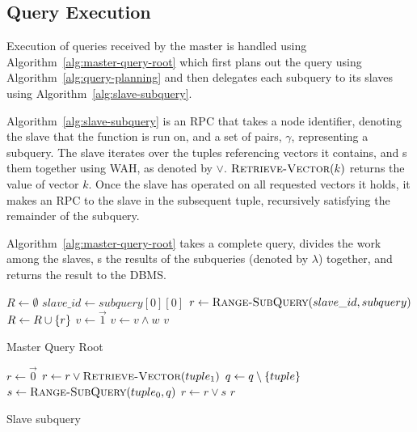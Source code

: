 \subsection{Query Execution}
Execution of queries received by the master is handled using
Algorithm~\ref{alg:master-query-root} which first plans out the query using
Algorithm~\ref{alg:query-planning} and then delegates each subquery to its
slaves using Algorithm~\ref{alg:slave-subquery}.
\par
Algorithm~\ref{alg:slave-subquery} is an RPC that takes a node identifier,
denoting the slave that the function is run on, and a set of pairs, \(\gamma\),
representing a subquery. The slave iterates over the tuples referencing vectors
it contains, and s them together using WAH, as denoted by \(\lor\).
\(\mathrm{\textsc{Retrieve-Vector}}(k)\) returns the value of vector \(k\).
Once the slave has operated on all requested vectors it holds, it makes an RPC
to the slave in the subsequent tuple, recursively satisfying the remainder of
the subquery.
\par
Algorithm~\ref{alg:master-query-root} takes a complete query, divides the work
among the slaves, s the results of the subqueries (denoted by
\(\lambda\)) together, and returns the result to the DBMS.
%
\begin{algorithm}
    \begin{algorithmic}
            \State $R \gets \emptyset$
                \State $slave\_id \gets subquery[0][0]$
                \State $r \gets \Call{Range-SubQuery}{slave\_id, subquery}$
                \State $R \gets R \cup \left\{r\right\}$
            \EndFor
            \State $v \gets \vec{1}$
                \State $v \gets v \land w$
            \EndFor
            \State \Return $v$
        \EndProcedure
    \end{algorithmic}
    \caption{Master Query Root}
    \label{alg:master-query-root}
\end{algorithm}
%
\begin{algorithm}
    \begin{algorithmic}
            \State $r \gets \vec{0}$
                    \State $r \gets r \lor \Call{Retrieve-Vector}{tuple_1}$
                    \State $q \gets q \setminus \left\{tuple\right\}$
                \Else
                    \State $s \gets \Call{Range-SubQuery}{tuple_0, q}$
                    \State $r \gets r \lor s$
                \EndIf
            \EndFor
            \State \Return $r$
        \EndProcedure
    \end{algorithmic}
    \caption{Slave subquery}
    \label{alg:slave-subquery}
\end{algorithm}
%
